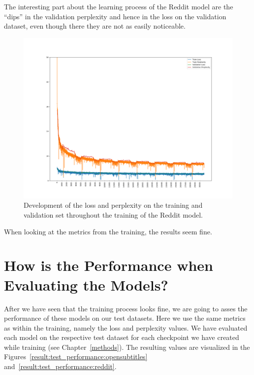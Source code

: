 The interesting part about the learning process of the Reddit model are the ``dips'' in the validation perplexity and hence in the loss on the validation dataset, even though there they are not as easily noticeable.

\begin{figure}[H]
	\includegraphics[width=\linewidth]{img/plots/reddit/train_metrics.png}
	\caption{Development of the loss and perplexity on the training and validation set throughout the training of the Reddit model.}
	\label{results:learning_process:metrics:reddit}
\end{figure}

When looking at the metrics from the training, the results seem fine.

\section{How is the Performance when Evaluating the Models?}
After we have seen that the training process looks fine, we are going to asses the performance of these models on our test datasets. Here we use the same metrics as within the training, namely the loss and perplexity values. We have evaluated each model on the respective test dataset for each checkpoint we have created while training (see Chapter~\ref{methods}). The resulting values are visualized in the Figures~\ref{result:test_performance:opensubtitles} and~\ref{result:test_performance:reddit}.

